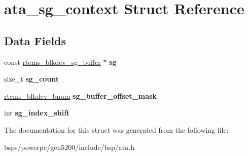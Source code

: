 \hypertarget{structata__sg__context}{}\section{ata\+\_\+sg\+\_\+context Struct Reference}
\label{structata__sg__context}
\subsection*{Data Fields}
\begin{DoxyCompactItemize}
\item 
\mbox{\label{structata__sg__context_ad07ae9bf73d8bdbb98c8099a9a82d723}} 
const \mbox{\hyperlink{structrtems__blkdev__sg__buffer}{rtems\+\_\+blkdev\+\_\+sg\+\_\+buffer}} $\ast$ {\bfseries sg}
\item 
\mbox{\label{structata__sg__context_a73dfe104377c10eb0e2b4ff87f15a8cf}} 
size\+\_\+t {\bfseries sg\+\_\+count}
\item 
\mbox{\label{structata__sg__context_a0e07610961e956743860848374d9a811}} 
\mbox{\hyperlink{group__rtems__disk_ga5fbcfd40b657bff6c54d9e393fab3274}{rtems\+\_\+blkdev\+\_\+bnum}} {\bfseries sg\+\_\+buffer\+\_\+offset\+\_\+mask}
\item 
\mbox{\label{structata__sg__context_abd59404c1ebe8c7871151b1be394961c}} 
int {\bfseries sg\+\_\+index\+\_\+shift}
\end{DoxyCompactItemize}


The documentation for this struct was generated from the following file\+:\begin{DoxyCompactItemize}
\item 
bsps/powerpc/gen5200/include/bsp/ata.\+h\end{DoxyCompactItemize}
